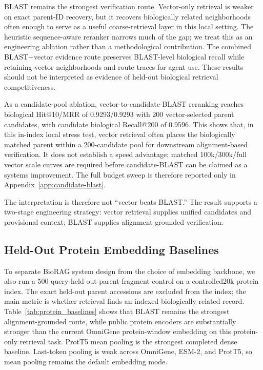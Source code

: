 \documentclass[11pt]{article}
\begin{document}
BLAST remains the strongest verification route. Vector-only retrieval is weaker on exact parent-ID recovery, but it recovers biologically related neighborhoods often enough to serve as a useful coarse-retrieval layer in this local setting. The heuristic sequence-aware reranker narrows much of the gap; we treat this as an engineering ablation rather than a methodological contribution. The combined BLAST+vector evidence route preserves BLAST-level biological recall while retaining vector neighborhoods and route traces for agent use. These results should not be interpreted as evidence of held-out biological retrieval competitiveness.

As a candidate-pool ablation, vector-to-candidate-BLAST reranking reaches biological Hit@10/MRR of 0.9293/0.9293 with 200 vector-selected parent candidates, with candidate biological Recall@200 of 0.9596. This shows that, in this in-index local stress test, vector retrieval often places the biologically matched parent within a 200-candidate pool for downstream alignment-based verification. It does not establish a speed advantage; matched 100k/300k/full vector scale curves are required before candidate-BLAST can be claimed as a systems improvement. The full budget sweep is therefore reported only in Appendix~\ref{app:candidate-blast}.

The interpretation is therefore not ``vector beats BLAST.'' The result supports a two-stage engineering strategy: vector retrieval supplies unified candidates and provisional context; BLAST supplies alignment-grounded verification.

\subsection{Held-Out Protein Embedding Baselines}

To separate BioRAG system design from the choice of embedding backbone, we also run a 500-query held-out parent-fragment control on a controlled20k protein index. The exact held-out parent accessions are excluded from the index; the main metric is whether retrieval finds an indexed biologically related record. Table~\ref{tab:protein_baselines} shows that BLAST remains the strongest alignment-grounded route, while public protein encoders are substantially stronger than the current OmniGene protein-window embedding on this protein-only retrieval task. ProtT5 mean pooling is the strongest completed dense baseline. Last-token pooling is weak across OmniGene, ESM-2, and ProtT5, so mean pooling remains the default embedding mode.
\end{document}
